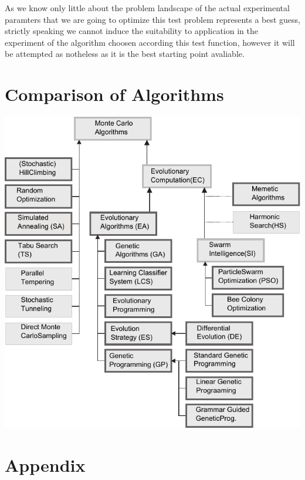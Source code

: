 \documentclass[a4paper,titlepage]{report}
\begin{document}
As we know only little about the problem landscape of the actual experimental paramters that we are going to optimize this test problem represents a best guess, strictly speaking we cannot induce the suitability to application in the experiment of the algorithm choosen according this test function, however it will be attempted as notheless as it is the best starting point avaliable.


\section{Comparison of Algorithms}




\newpage
\includegraphics{Images/taxonomy_v2.pdf}

\section{Appendix}
\end{document}
